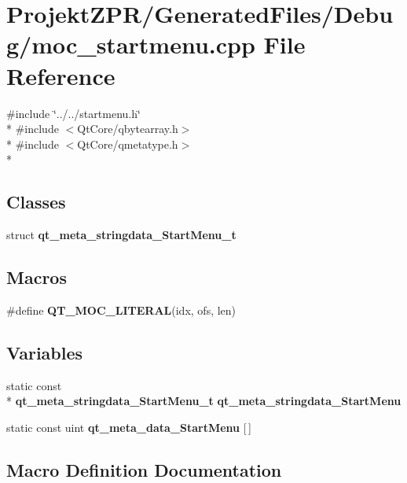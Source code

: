 \section{Projekt\-Z\-P\-R/\-Generated\-Files/\-Debug/moc\-\_\-startmenu.cpp File Reference}
\label{_debug_2moc__startmenu_8cpp}
{\ttfamily \#include \char`\"{}../../startmenu.\-h\char`\"{}}\\*
{\ttfamily \#include $<$Qt\-Core/qbytearray.\-h$>$}\\*
{\ttfamily \#include $<$Qt\-Core/qmetatype.\-h$>$}\\*
\subsection*{Classes}
\begin{DoxyCompactItemize}
\item 
struct {\bf qt\-\_\-meta\-\_\-stringdata\-\_\-\-Start\-Menu\-\_\-t}
\end{DoxyCompactItemize}
\subsection*{Macros}
\begin{DoxyCompactItemize}
\item 
\#define {\bf Q\-T\-\_\-\-M\-O\-C\-\_\-\-L\-I\-T\-E\-R\-A\-L}(idx, ofs, len)
\end{DoxyCompactItemize}
\subsection*{Variables}
\begin{DoxyCompactItemize}
\item 
static const \\*
{\bf qt\-\_\-meta\-\_\-stringdata\-\_\-\-Start\-Menu\-\_\-t} {\bf qt\-\_\-meta\-\_\-stringdata\-\_\-\-Start\-Menu}
\item 
static const uint {\bf qt\-\_\-meta\-\_\-data\-\_\-\-Start\-Menu} [$\,$]
\end{DoxyCompactItemize}


\subsection{Macro Definition Documentation}

